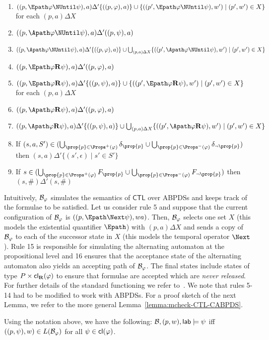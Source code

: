 \documentclass{llncs}
\renewcommand{\CTL}{\ensuremath{\mathsf{CTL}}\xspace}
\let\phi\varphi
\begin{document}
{\begin{itemize}
\begin{enumerate}
\item $((p,\Epath\varphi\NUntil\psi),a)\Delta'\{((p,\varphi),a)\}\cup \{((p',\Epath\varphi\NUntil\psi),w')\mid (p',w') \in X\}$ for each $(p,a)\Delta X$
\item $((p,\Apath\varphi\NUntil\psi),a) \Delta'((p,\psi),a)$
\item $((p,\Apath\varphi\NUntil\psi),a)\Delta'\{((p,\varphi),a)\}\cup \bigcup_{(p,a)\Delta X}\{((p',\Apath\varphi\NUntil\psi),w')\mid (p',w') \in X\}$
\item $((p,\Epath\varphi\Release\psi),a) \Delta'((p,\varphi),a)$
\item $((p,\Epath\varphi\Release\psi),a)\Delta'\{((p,\psi),a)\}\cup\{((p',\Epath\varphi\Release\psi),w')\mid (p',w') \in X\}$ for each  $(p,a)\Delta X$
\item $((p,\Apath\varphi\Release\psi),a) \Delta'((p,\varphi),a)$
\item $((p,\Apath\varphi\Release\psi),a)\Delta'\{((p,\psi),a)\}\cup\bigcup_{(p,a)\Delta X}\{((p',\Apath\varphi\Release\psi),w')\mid (p',w') \in X\}$
\item If $(s,a,S')\in (\bigcup_{\prop{p}\in \Props^+(\varphi)}\delta_\prop{p}\cup \bigcup_{\prop{p}\in \Props^-(\varphi)}\delta_{\neg\prop{p}})$ then   $(s,a)\Delta'\{(s',\epsilon) \mid s' \in S'\}$
\item If $s\in(\bigcup_{\prop{p}\in \Props^+(\varphi)}F_\prop{p}\cup \bigcup_{\prop{p}\in \Props^-(\varphi)}F_{\neg\prop{p}})$ then   $(s,\#)\Delta'(s,\#)$
\end{enumerate}
\end{itemize}
Intuitively, $\mathcal{B}_{\varphi}$ simulates the semantics of $\CTL$ over ABPDSs and keeps track of the formulae to be satisfied. Let us consider rule 5 and suppose that the current configuration of $\mathcal{B}_\varphi$ is $((p,\Epath\Next\psi),wa)$. Then, $\mathcal{B}_\varphi$ selects one set $X$ (this models the existential quantifier $\Epath$) with $(p,a)\Delta X$ and sends a copy of $\mathcal{B}_\varphi$ to each of the successor state in $X$ (this models the temporal operator $\Next$). Rule 15 is responsible for simulating the alternating automaton at the propositional level and 16 ensures that the acceptance state of the alternating automaton also yields an accepting path of $\mathcal{B}_\varphi$. The final states include states of type $P\times\mathsf{cl}_\mathbf{R}(\varphi)$ to ensure that formulae are accepted which are \emph{never released}. For further details of the standard functioning we refer to~\cite{song2014efficient}. We note that rules 5-14 had to be modified to work with ABPDSs. For a proof sketch of the next Lemma, we refer to the more general Lemma~\ref{lemma:mcheck-CTL-CABPDS}.



\begin{lemma}\label{lemma:mcheck-CTL-ABPDS}
Using the notation above, we have the following: 
$\mathcal{B},(p,w),\mathsf{lab}\models\psi$ iff $((p,\psi),w)\in L(\mathcal{B}_{\varphi})$ for all $\psi \in \cl(\phi)$.
\end{lemma}}
\end{document}
